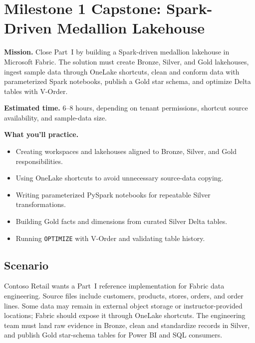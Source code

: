 \section{Milestone 1 Capstone: Spark-Driven Medallion Lakehouse}\label{sec:ch4-capstone}

\begin{capstonebox}
\textbf{Mission.} Close Part~I by building a Spark-driven medallion lakehouse in Microsoft Fabric. The solution must create Bronze, Silver, and Gold lakehouses, ingest sample data through OneLake shortcuts, clean and conform data with parameterized Spark notebooks, publish a Gold star schema, and optimize Delta tables with V-Order.

\textbf{Estimated time.} 6--8 hours, depending on tenant permissions, shortcut source availability, and sample-data size.

\textbf{What you'll practice.}
\begin{itemize}
    \item Creating workspaces and lakehouses aligned to Bronze, Silver, and Gold responsibilities.
    \item Using OneLake shortcuts to avoid unnecessary source-data copying.
    \item Writing parameterized PySpark notebooks for repeatable Silver transformations.
    \item Building Gold facts and dimensions from curated Silver Delta tables.
    \item Running \texttt{OPTIMIZE} with V-Order and validating table history.
\end{itemize}
\end{capstonebox}

\subsection*{Scenario}
Contoso Retail wants a Part~I reference implementation for Fabric data engineering. Source files include customers, products, stores, orders, and order lines. Some data may remain in external object storage or instructor-provided locations; Fabric should expose it through OneLake shortcuts. The engineering team must land raw evidence in Bronze, clean and standardize records in Silver, and publish Gold star-schema tables for Power BI and SQL consumers.

